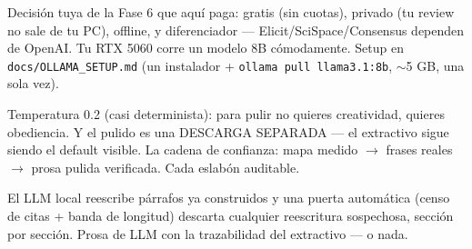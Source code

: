 \documentclass[11pt,a4paper]{article}
\begin{document}
Decisión tuya de la Fase 6 que aquí paga: gratis (sin cuotas), privado (tu review no
sale de tu PC), offline, y diferenciador — Elicit/SciSpace/Consensus dependen de OpenAI.
Tu RTX 5060 corre un modelo 8B cómodamente. Setup en \texttt{docs/OLLAMA\_SETUP.md}
(un instalador + \texttt{ollama pull llama3.1:8b}, $\sim$5 GB, una sola vez).

\begin{ojo}
Temperatura 0.2 (casi determinista): para pulir no quieres creatividad, quieres
obediencia. Y el pulido es una DESCARGA SEPARADA --- el extractivo sigue siendo el
default visible. La cadena de confianza: mapa medido $\rightarrow$ frases reales
$\rightarrow$ prosa pulida verificada. Cada eslabón auditable.
\end{ojo}

\begin{resumen}
El LLM local reescribe párrafos ya construidos y una puerta automática (censo de citas +
banda de longitud) descarta cualquier reescritura sospechosa, sección por sección.
Prosa de LLM con la trazabilidad del extractivo — o nada.
\end{resumen}
\end{document}
